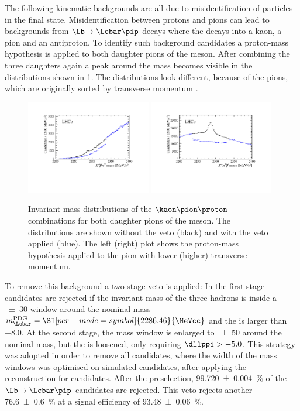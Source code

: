 The following kinematic backgrounds are all due to misidentification of particles in the final state.
Misidentification between protons and pions can lead to backgrounds from $\Lb\!\to\Lcbar\pip$ decays where the \Lcbar decays into a kaon, a pion and an antiproton.
To identify such background candidates a proton-mass hypothesis is applied to both daughter pions of the \Dm meson.
After combining the three \D daughters again a peak around the \Lc mass becomes visible in the distributions shown in \cref{fig:LcVeto}.
The distributions look different, because of the pions, which are originally sorted by transverse momentum \pt.
\begin{figure}[tbp]
    \centering
    \includegraphics[width=0.485\textwidth]{06selection/figs/LcHypo1.pdf}
    \includegraphics[width=0.485\textwidth]{06selection/figs/LcHypo2.pdf}
    \caption{Invariant mass distributions of the $\kaon\pion\proton$ combinations for both daughter pions of the \Dm meson.
    The distributions are shown without the veto (black) and with the veto applied (blue).
    The left (right) plot shows the proton-mass hypothesis applied to the pion with lower (higher) transverse momentum.}
    \label{fig:LcVeto}
\end{figure}
To remove this background a two-stage veto is applied: In the first stage candidates are rejected if the invariant mass of the three hadrons is inside a \SI[per-mode=symbol]{\pm30}{\MeVcc}  window around the nominal \mbox{\Lcbar mass} $m_\Lcbar^{\text{PDG}}=\SI[per-mode=symbol]{2286.46}{\MeVcc}$ and the \dllppi is larger than \num{-8.0}.
At the second stage, the mass window is enlarged to \SI[per-mode=symbol]{\pm50}{\MeVcc} around the nominal \Lcbar mass, but the \dllppi is loosened, only requiring $\dllppi>-5.0$.
This strategy was adopted in order to remove all \Lcbar candidates, where the width of the mass windows was optimised on simulated \Lcbar candidates, after applying the reconstruction for \BdToDpi candidates.
After the preselection, \SI{99.720\pm0.004}{\percent} of the $\Lb\!\to\Lcbar\pip$ candidates are rejected.
This veto rejects another \SI{76.6\pm0.6}{\percent} at a signal efficiency of \SI{93.48\pm0.06}{\percent}.

